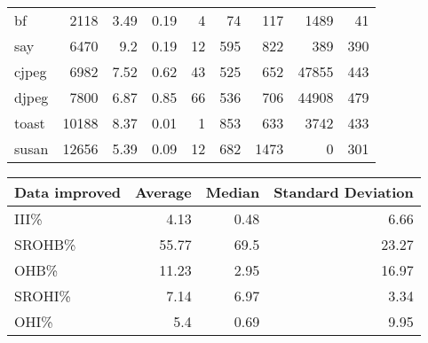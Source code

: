 \begin{tabular}{lrrrrrrrr}
 bf             &           2118 &     3.49 &   0.19 &    4 &     74 &          117 &  1489 &    41 \\
 say            &           6470 &     9.2  &   0.19 &   12 &    595 &          822 &   389 &   390 \\
 cjpeg          &           6982 &     7.52 &   0.62 &   43 &    525 &          652 & 47855 &   443 \\
 djpeg          &           7800 &     6.87 &   0.85 &   66 &    536 &          706 & 44908 &   479 \\
 toast          &          10188 &     8.37 &   0.01 &    1 &    853 &          633 &  3742 &   433 \\
 susan          &          12656 &     5.39 &   0.09 &   12 &    682 &         1473 &     0 &   301 \\
\hline
\end{tabular}\begin{tabular}{lrrr}
\hline
 Data improved   &   Average &   Median &   Standard Deviation \\
\hline
 III\%            &      4.13 &     0.48 &                 6.66 \\
 SROHB\%          &     55.77 &    69.5  &                23.27 \\
 OHB\%            &     11.23 &     2.95 &                16.97 \\
 SROHI\%          &      7.14 &     6.97 &                 3.34 \\
 OHI\%            &      5.4  &     0.69 &                 9.95 \\
\hline
\end{tabular}